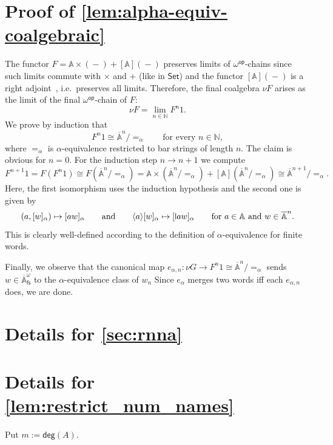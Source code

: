 \documentclass[10pt,a4paper]{amsart}
\newcommand{\midmid}{\hspace{0.2ex}{\rule[-0.1ex]{0.6pt}{1.65ex}}\hspace{0.2ex}}
\newcommand{\newletter}[1]{{\midmid}#1}
\newcommand{\degree}{\mathsf{deg}}
\newcommand{\barA}{\overline{\names}}
\numberwithin{equation}{section}
\newcommand{\dash}{\mathop{-}}
\newcommand{\braket}[1]{\langle #1 \rangle}
\newcommand{\fs}{\mathsf{fs}}
\newcommand{\Nat}{{\mathbb{N}}}
\newcommand{\Set}{\mathsf{Set}}
\newcommand{\+}[1]{\mathcal{#1}\xspace}
\newcommand{\op}{{\mathsf{op}}}
\newcommand{\names}{\mathbb{A}}
\theoremstyle{definition}
\begin{document}
\section*{Proof of \autoref{lem:alpha-equiv-coalgebraic}}
  The functor $F=\names\times (\dash) + [\names](\dash)$ preserves
  limits of $\omega^\op$-chains since such limits commute with
  $\times$ and $+$ (like in $\Set$) and the functor
  $[\names](\dash)$ is a right adjoint~\cite[Thm. 4.12]{Pitts13}, i.e.~preserves all limits. Therefore, the final
  coalgebra $\nu F$ arises as the limit of the final
  $\omega^\op$-chain of $F$:
  \[
    \nu F = \lim_{n\in \Nat} F^n 1.
  \]
  We prove by induction that
  \[
    F^n1 \cong \barA^n/{=_\alpha}\qquad\text{for every $n\in \Nat$},
  \]
  where $=_\alpha$ is $\alpha$-equivalence restricted to bar strings
  of length $n$.  The claim is obvious for $n=0$. For the induction
  step $n\to n+1$ we compute
  \[
    F^{n+1}1
    =
    F(F^n1)\cong F(\barA^n/{=_\alpha})
    =
    \names\times (\barA^n/{=_\alpha}) + [\names](\barA^n/{=_\alpha})
    \cong \barA^{n+1}/{=_\alpha}.
  \]
  Here, the first isomorphism uses the induction hypothesis and the
  second one is given by
  \[
    (a,[w]_\alpha) \mapsto  [aw]_\alpha
    \qquad\text{and}\qquad
    \braket{a} [w]_\alpha \mapsto [\newletter aw]_\alpha
    \qquad\text{for $a\in \names$ and $w\in \barA^n$.}
  \]
  This is clearly well-defined %
  according to the definition of $\alpha$-equivalence for finite
  words.

  Finally, we observe that the canonical map
  $e_{\alpha,n}\colon \nu G\to F^n1 \cong \barA^n/{=_\alpha}$ sends
  $w\in \barA^\omega_\fs$ to the $\alpha$-equivalence class of
  $w_n$ Since $e_\alpha$ merges two words iff each $e_{\alpha,n}$
  does, we are done. %

\section{Details for \autoref{sec:rnna}}

\section*{Details for \autoref{lem:restrict_num_names}}

  Put $m:=\degree(A)$. 
\end{document}
